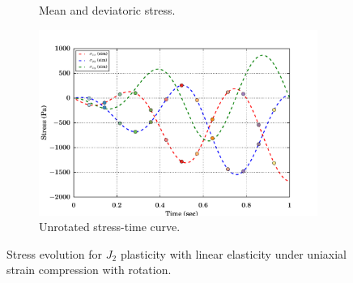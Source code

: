 \begin{figure}[htbp!]
\begin{subfigure}{0.5\textwidth}
    \caption{Mean and deviatoric stress.}
  \end{subfigure}
  \begin{subfigure}{0.5\textwidth}
    \centering
    \includegraphics[width=\textwidth]{MPMMaterials/FIGS/UniaxialStrainRotateJ2Lin_sigma_time.pdf}
    \caption{Unrotated stress-time curve.}
  \end{subfigure}
  \caption{Stress evolution for $J_2$ plasticity with linear elasticity under uniaxial
           strain compression with rotation.}
  \label{fig:J2LinRot}
\end{figure}

\newpage
